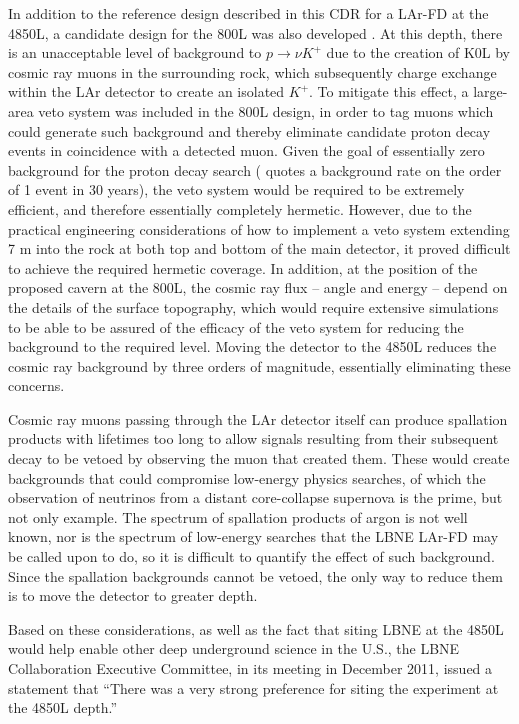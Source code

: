 In addition to the reference design described in this CDR for a LAr-FD at the 4850L, a candidate design for the 800L was also developed \cite{docdb4314}.  At this depth, there is an unacceptable level of background to $p \rightarrow \nu K^+$ due to the creation of K0L by cosmic ray muons in the surrounding rock, which subsequently charge exchange within the LAr detector to create an isolated $K^+$.  To mitigate this effect, a large-area veto system was included in the 800L design, in order to tag muons which could generate such background and thereby eliminate candidate proton decay events in coincidence with a detected muon.  Given the goal of essentially zero background for the proton decay search (\cite{bueno-pdk} quotes a background rate on the order of 1 event in 30 years), the veto system would be required to be extremely efficient, and therefore essentially completely hermetic.  However, due to the practical engineering considerations of how to implement a veto system extending 7 m into the rock at both top and bottom of the main detector, it proved difficult to achieve the required hermetic coverage.  In addition, at the position of the proposed cavern at the 800L, the cosmic ray flux – angle and energy – depend on the details of the surface topography, which would require extensive simulations to be able to be assured of the efficacy of the veto system for reducing the background to the required level.  Moving the detector to the 4850L reduces the cosmic ray background by three orders of magnitude, essentially eliminating these concerns.

Cosmic ray muons passing through the LAr detector itself can produce spallation products with lifetimes too long to allow signals resulting from their subsequent decay to be vetoed by observing the muon that created them.  These would create backgrounds that could compromise low-energy physics searches, of which the observation of neutrinos from a distant core-collapse supernova is the prime, but not only example.  The spectrum of spallation products of argon is not well known, nor is the spectrum of low-energy searches that the LBNE LAr-FD may be called upon to do, so it is difficult to quantify the effect of such background.  Since the spallation backgrounds cannot be vetoed, the only way to reduce them is to move the detector to greater depth.

Based on these considerations, as well as the fact that siting LBNE at the 4850L would help enable other deep underground science in the U.S., the LBNE Collaboration Executive Committee, in its meeting in December 2011, issued a statement that ``There was a very strong preference for siting the experiment at the 4850L depth.''

